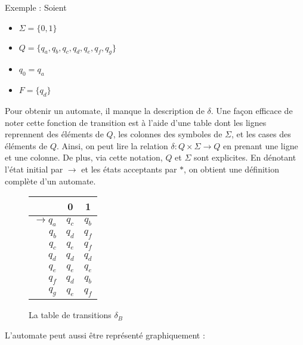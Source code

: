 	 
	 Exemple :
	 Soient 
	 \begin{itemize}
	 	\item $\Sigma=\{0,1\}$
	 	\item $Q=\{q_a,q_b,q_c,q_d,q_e,q_f,q_g\}$
	 	\item $q_0=q_a$
	 	\item $F=\{q_d\}$
	 \end{itemize}
 	
 	Pour obtenir un automate, il manque la description de $\delta$. Une façon efficace de noter cette fonction de transition est à l'aide d'une table dont les lignes reprennent des éléments de $Q$, les colonnes des symboles de $\Sigma$, et les cases des éléments de $Q$. Ainsi, on peut lire la relation $\delta : Q \times \Sigma \rightarrow Q$ en prenant une ligne et une colonne.
 	De plus, via cette notation, $Q$ et $\Sigma$ sont explicites. En dénotant l'état initial par $\rightarrow$ et les états acceptants par $*$, on obtient une définition complète d'un automate.
 	
 	\begin{figure}[H]
 	\centering
 	\begin{tabular}{|r||c|c|}
 		\hline
 		&0&1\\
 		\hline\hline
 		$\rightarrow q_a$&$q_c$&$q_b$\\\hline
 		$q_b$&$q_d$&$q_f$\\\hline
 		$q_c$&$q_e$&$q_f$\\\hline
 		$q_d$&$q_d$&$q_d$\\\hline
 		$q_e$&$q_e$&$q_e$\\\hline
 		$q_f$&$q_d$&$q_b$\\\hline
 		$q_g$&$q_e$&$q_f$\\\hline
 	\end{tabular}
	\caption{La table de transitions $\delta_B$}
 	\end{figure}
	 L'automate peut aussi être représenté graphiquement : 
	 
